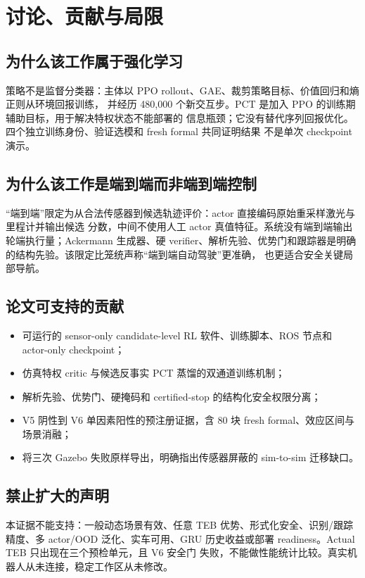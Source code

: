 \documentclass[12pt,a4paper,oneside]{report}
\begin{document}
\chapter{讨论、贡献与局限}
\section{为什么该工作属于强化学习}
策略不是监督分类器：主体以 PPO rollout、GAE、裁剪策略目标、价值回归和熵正则从环境回报训练，
并经历 480,000 个新交互步。PCT 是加入 PPO 的训练期辅助目标，用于解决特权状态不能部署的
信息瓶颈；它没有替代序列回报优化。四个独立训练身份、验证选模和 fresh formal 共同证明结果
不是单次 checkpoint 演示。

\section{为什么该工作是端到端而非端到端控制}
“端到端”限定为从合法传感器到候选轨迹评价：actor 直接编码原始重采样激光与里程计并输出候选
分数，中间不使用人工 actor 真值特征。系统没有端到端输出轮端执行量；Ackermann 生成器、硬
verifier、解析先验、优势门和跟踪器是明确的结构先验。该限定比笼统声称“端到端自动驾驶”更准确，
也更适合安全关键局部导航。

\section{论文可支持的贡献}
\begin{itemize}
  \item 可运行的 sensor-only candidate-level RL 软件、训练脚本、ROS 节点和 actor-only checkpoint；
  \item 仿真特权 critic 与候选反事实 PCT 蒸馏的双通道训练机制；
  \item 解析先验、优势门、硬掩码和 certified-stop 的结构化安全权限分离；
  \item V5 阴性到 V6 单因素阳性的预注册证据，含 80 块 fresh formal、效应区间与场景消融；
  \item 将三次 Gazebo 失败原样导出，明确指出传感器屏蔽的 sim-to-sim 迁移缺口。
\end{itemize}

\section{禁止扩大的声明}
本证据不能支持：一般动态场景有效、任意 TEB 优势、形式化安全、识别/跟踪精度、多 actor/OOD
泛化、实车可用、GRU 历史收益或部署 readiness。Actual TEB 只出现在三个预检单元，且 V6 安全门
失败，不能做性能统计比较。真实机器人从未连接，稳定工作区从未修改。
\end{document}
